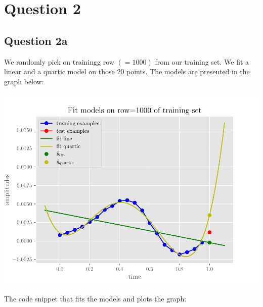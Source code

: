 \documentclass{article}
\begin{document}
\section{Question 2}
\subsection{Question 2a}

We randomly pick on trainingg row $(=1000)$ from our training set. We fit a linear and a quartic model on those 20 points. The models are presented in the graph below:

\includegraphics[scale=0.75]{fig_03.pdf}

The code snippet that fits the models and plots the graph:
\end{document}
